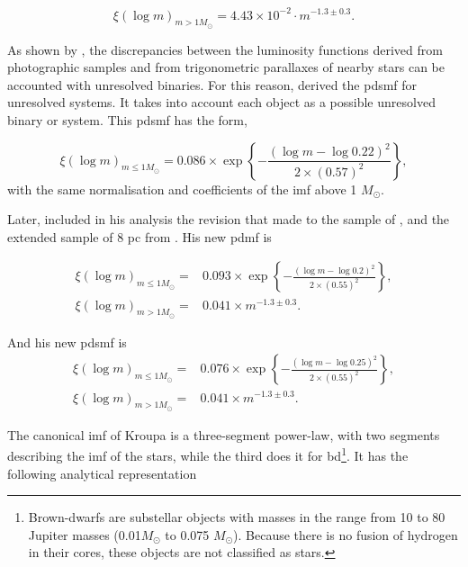 \begin{equation}
\xi(\log m)_{m>1M_{\odot}}= 4.43\times10^{-2}\cdot m^{-1.3\pm0.3}.\nonumber
\end{equation}

As shown by \citet{1991MNRAS.251..293K}, the discrepancies between the luminosity functions derived from photographic samples and from trigonometric parallaxes of nearby stars can be accounted with unresolved binaries. For this reason, \citet{Chabrier2003a} derived the \gls{pdsmf} for unresolved systems. It takes into account each object as a possible unresolved binary or system. This \gls{pdsmf} has the form,

\begin{equation}
\xi(\log m)_{m\leq1M_{\odot}}=0.086\times \exp{\left\{-\frac{(\log m - \log 0.22)^2}{2 \times (0.57)^2}\right\}},\nonumber
\end{equation}
with the same normalisation and coefficients of the \gls{imf} above 1 $M_{\odot}$.

Later, \citet{Chabrier2005} included in his analysis the revision that \citet{2002AJ....124.2721R} made to the sample of \citep{1986AJ.....91..621D}, and the extended sample of 8 pc from \citet{2004AJ....128..463R}. His new \gls{pdmf} is

 \begin{align}
\xi(\log m)_{m\leq1M_{\odot}}=&0.093\times \exp{\left\{-\frac{(\log m - \log 0.2)^2}{2 \times (0.55)^2}\right\}},\nonumber\\
\xi(\log m)_{m>1M_{\odot}}=& 0.041\times m^{-1.3\pm0.3}.\nonumber
\end{align}

And his new \gls{pdsmf} is
 \begin{align}
\xi(\log m)_{m\leq1M_{\odot}}=&0.076\times \exp{\left\{-\frac{(\log m - \log 0.25)^2}{2 \times (0.55)^2}\right\}},\nonumber\\
\xi(\log m)_{m>1M_{\odot}}=& 0.041\times m^{-1.3\pm0.3}.
\end{align}

The canonical \gls{imf} of Kroupa \citep{2013pss5.book..115K} is a three-segment power-law, with two segments describing the \gls{imf} of the stars, while the third does it for \gls{bd}\footnote{Brown-dwarfs are substellar objects with masses in the range from 10 to 80 Jupiter masses (0.01$M_{\odot}$ to 0.075 $M_{\odot}$). Because there is no fusion of hydrogen in their cores, these objects are not classified as stars.}. It has the following analytical representation

